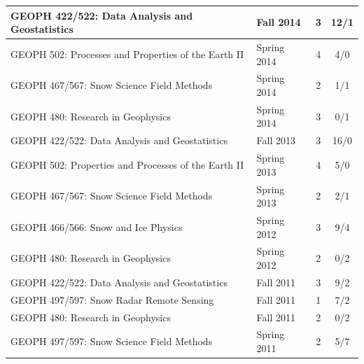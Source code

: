\documentclass[11pt]{article}
\begin{document}
\begin{table}[!htbp]
\begin{tabular}{|l|l|c|c|}
GEOPH 422/522: Data Analysis and Geostatistics & Fall 2014 & 3 & 12/1 \\ \hline
GEOPH 502: Processes and Properties of the Earth II & Spring 2014 & 4 & 4/0 \\ \hline
GEOPH 467/567: Snow Science Field Methods & Spring 2014 & 2 & 1/1 \\ \hline
GEOPH 480: Research in Geophysics & Spring 2014 & 3 & 0/1 \\ \hline
GEOPH 422/522: Data Analysis and Geostatistics & Fall 2013 & 3 & 16/0 \\ \hline
GEOPH 502: Properties and Processes of the Earth II & Spring 2013 & 4 & 5/0 \\ \hline
GEOPH 467/567: Snow Science Field Methods & Spring 2013 & 2 & 2/1 \\ \hline
GEOPH 466/566: Snow and Ice Physics & Spring 2012 & 3 & 9/4 \\ \hline
GEOPH 480: Research in Geophysics & Spring 2012 & 2 & 0/2 \\ \hline
GEOPH 422/522: Data Analysis and Geostatistics & Fall 2011 & 3 & 9/2 \\ \hline
GEOPH 497/597: Snow Radar Remote Sensing & Fall 2011 & 1 & 7/2 \\ \hline
GEOPH 480: Research in Geophysics & Fall 2011 & 2 & 0/2 \\ \hline
GEOPH 497/597: Snow Science Field Methods & Spring 2011 & 2 & 5/7 \\ \hline

\end{tabular}
\end{table}
\end{document}
